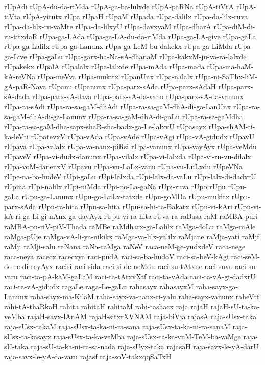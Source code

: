 {rUpAdi
rUpA-du-da-riMda
rUpA-ga-ba-lulxde
rUpA-paRNa
rUpA-tiVtA
rUpA-tiVta
rUpA-yitutx
rUpa
rUpaH
rUpaM
rUpada
rUpa-dalilx
rUpa-da-lilx-ruva
rUpa-da-lilx-ru-vaMte
rUpa-da-lilxyU
rUpa-davxyaM
rUpa-dharA
rUpa-diM-di-ru-titxdaR
rUpa-ga-LAda
rUpa-ga-LA-du-da-riMda
rUpa-ga-LA-give
rUpa-gaLa
rUpa-ga-Lalilx
rUpa-ga-Lanunx
rUpa-ga-LeM-bu-dakekx
rUpa-ga-LiMda
rUpa-ga-Live
rUpa-gaLu
rUpa-garx-ha-Na-sA-dhanaM
rUpa-kakxM-ju-va-ra-lalxde
rUpakekx
rUpalA
rUpalalx
rUpa-lalxde
rUpa-mAda
rUpa-mada
rUpa-ma-haM-kA-reVNa
rUpa-meVva
rUpa-mukitx
rUpanUnx
rUpa-nalalx
rUpa-ni-SaThx-liM-gA-paR-Nava
rUpanu
rUpanunx
rUpa-parx-sAda
rUpa-parx-sAdaH
rUpa-parx-sA-dada
rUpa-parx-sA-dava
rUpa-parx-sA-da-vanu
rUpa-parx-sA-da-vanunx
rUpa-ra-sAdi
rUpa-ra-sa-gaM-dhAdi
rUpa-ra-sa-gaM-dhA-di-ga-LanUnx
rUpa-ra-sa-gaM-dhA-di-ga-Lanunx
rUpa-ra-sa-gaM-dhA-di-gaLu
rUpa-ra-sa-gaMdha
rUpa-ra-sa-gaM-dha-sapx-shaR-sha-badx-ga-Le-lalxvU
rUpasayx
rUpa-shAM-ti-ka-leVti
rUpatevxV
rUpa-vAda
rUpa-vAde
rUpa-vAgi
rUpa-vA-gidudx
rUpavU
rUpava
rUpa-valalx
rUpa-va-nanx-piRsi
rUpa-vanunx
rUpa-vayAyx
rUpa-veMdu
rUpaveV
rUpa-vi-dudx-danunx
rUpa-vilalx
rUpa-vi-lalxda
rUpa-vi-ru-vu-dilalx
rUpa-voM-danenxV
rUpavu
rUpa-vu-LaLx-vanu
rUpa-vu-LuLxdu
rUpeVNa
rUpe-na-ba-hudeV
rUpi-gaLu
rUpi-lalxda
rUpi-lalx-da-vaLu
rUpi-lalx-di-dadxrU
rUpina
rUpi-nalilx
rUpi-niMda
rUpi-no-La-gaNa
rUpi-ruva
rUpo
rUpu
rUpu-gaLa
rUpu-ga-Lanunx
rUpu-go-LuLx-tatxde
rUpu-goMDa
rUpu-mukitx
rUpu-parx-sAda
rUpu-ra-hita
rUpu-sa-hita
rUpu-sa-hi-ta-Bakatx
rUpu-vi-kAri
rUpu-vi-kA-ri-ga-Li-gi-nAnx-ga-dayAyx
rUpu-vi-ra-hita
rUva
ra
raBasa
raM
raMBA-puri
raMBA-pu-riV-piV-Thada
raMBe
raMdharx-ga-Lalilx
raMga-doLu
raMga-mAle
raMga-pUje
raMga-vA-li-ya-nikikx
raMga-va-lilx-yalilx
raMjane
raMja-yati
raMjf
raMji
raMji-salu
raNana
raNa-raMga
raNeV
raca-neM-ge-yudxdeV
raca-nege
raca-neya
racecx
racecxya
raci-pudA
raci-sa-ba-hudoV
raci-sa-beV-kAgi
raci-seM-do-re-di-rayAyx
racisi
raci-sida
raci-si-de-neMdu
raci-su-tAtxne
raci-suva
raci-su-varu
raci-ta-pA-kaM-gaLaM
raci-ta-tAtxvXtf
raci-ta-vAda
raci-ta-vA-gi-dadxrU
raci-ta-vA-gidudx
ragaLe
raga-Le-gaLu
rahasayx
rahasayxM
raha-sayx-ga-Lanunx
raha-sayx-ma-KilaM
raha-sayx-va-nanx-ri-yalu
raha-sayx-vanunx
raheVtf
rahi-tA-thaRkaH
rahita
rahitaH
rahitaM
rahi-tashacx
raja
rajaH
rajaH-sU-ta-ka-veMba
rajaH-savx-lAnAM
rajaH-sitxrXVNAM
raja-biVja
rajasA
raja-sUsx-taka
raja-sUsx-takaM
raja-sUsx-ta-ka-ni-ra-sana
raja-sUsx-ta-ka-ni-ra-sanaM
raja-sUsx-ta-kasayx
raja-sUsx-ta-ka-veMba
raja-sUsx-ta-ka-vuM-TeM-ba-vaMge
raja-sU-taka
raja-sU-ta-ka-ni-ra-sa-nada
raja-sUyx-taka
rajasaH
raja-savx-le-yA-darU
raja-savx-le-yA-da-varu
rajasf
raja-soV-takxqqSaTxH
}
